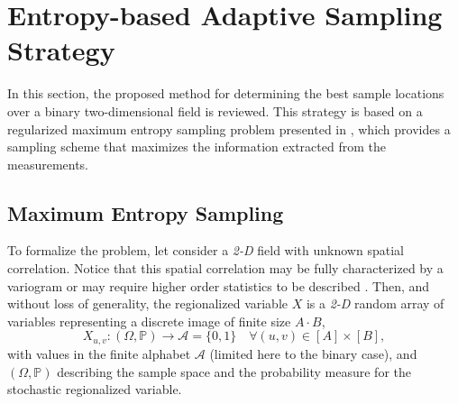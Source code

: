 \section{Entropy-based Adaptive Sampling Strategy}
\label{sec_Pre_RAMIS_PII}

In this section, the proposed method for determining the best sample locations over a binary two-dimensional field is reviewed. 
%
This strategy is based on a regularized maximum entropy sampling problem presented in \cite{Santibanez2019_a}, which provides a  sampling scheme that maximizes the information extracted from the measurements. 

\subsection{Maximum Entropy Sampling}


To formalize the problem, let consider a \emph{2-D} field with unknown spatial correlation. Notice that this spatial correlation may be fully characterized by a variogram or may require higher order statistics to be described \citep{Mariethoz_2014_a,Ortiz2003}. Then, and without loss of generality, the regionalized variable $X$ is a \emph{2-D} random array of variables representing a discrete image of finite size $A \cdot B$, %
\begin{equation} \label{eq:Pre_Z_PII}
X_{u,v} :(\Omega,\mathds{P})\rightarrow \mathcal{A} = \{0, 1\} \quad \forall  (u,v) \in [A] \times [B]  ,
\end{equation}
with values in the finite alphabet $\mathcal{A}$ (limited here to the binary case), and $(\Omega,\mathds{P})$ describing the sample space and the probability measure for the stochastic regionalized variable.

